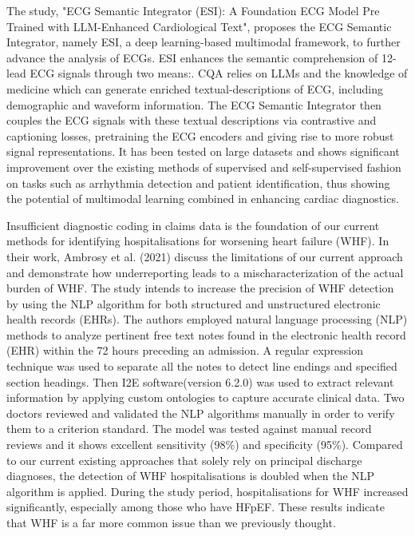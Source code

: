 The study\cite{yu2024ecgsemanticintegratoresi}, "ECG Semantic Integrator (ESI): A Foundation ECG Model Pre Trained with LLM-Enhanced Cardiological Text", proposes the ECG Semantic Integrator, namely ESI, a deep learning-based multimodal framework, to further advance the analysis of ECGs. ESI enhances the semantic comprehension of 12-lead ECG signals through two means:. CQA relies on LLMs and the knowledge of medicine which can generate enriched textual-descriptions of ECG, including demographic and waveform information. The ECG Semantic Integrator then couples the ECG signals with these textual descriptions via contrastive and captioning losses, pretraining the ECG encoders and giving rise to more robust signal representations. It has been tested on large datasets and shows significant improvement over the existing methods of supervised and self-supervised fashion on tasks such as arrhythmia detection and patient identification, thus showing the potential of multimodal learning combined in enhancing cardiac diagnostics.
\vspace{0.5cm}




Insufficient diagnostic coding in claims data is the foundation of our current methods for identifying hospitalisations for worsening heart failure (WHF). In their work, Ambrosy et al.\cite{10.1001/jamanetworkopen.2021.35152} (2021) discuss the limitations of our current approach and demonstrate how underreporting leads to a mischaracterization of the actual burden of WHF. The study intends to increase the precision of WHF detection by using the NLP algorithm for both structured and unstructured electronic health records (EHRs). The authors employed natural language processing (NLP) methods to analyze pertinent free text notes found in the electronic health record (EHR) within the 72 hours preceding an admission. A regular expression technique was used to separate all the notes to detect line endings and specified section headings.  Then  I2E software(version 6.2.0) was used to extract relevant information by applying custom ontologies to capture accurate clinical data.  Two doctors reviewed and validated the NLP algorithms manually in order to verify them to a criterion standard. The model was tested against manual record reviews and it shows excellent sensitivity (98\%) and specificity (95\%). Compared to our current existing approaches that solely rely on principal discharge diagnoses, the detection of WHF hospitalisations is doubled when the NLP algorithm is applied.  During the study period, hospitalisations for WHF increased significantly, especially among those who have HFpEF. These results indicate that WHF is a far more common issue than we previously thought.
\vspace{0.5cm}

